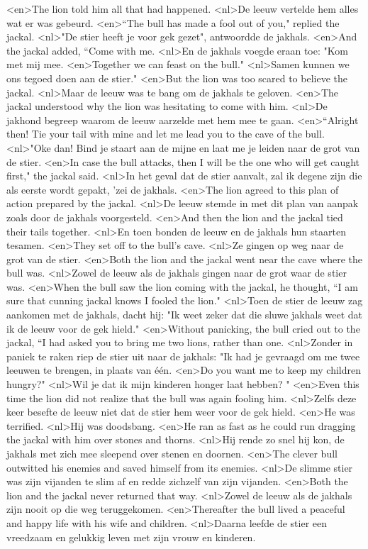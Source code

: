 <en>The lion told him all that had happened.
<nl>De leeuw vertelde hem alles wat er was gebeurd.
<en>“The bull has made a fool out of you," replied the jackal.
<nl>"De stier heeft je voor gek gezet", antwoordde de jakhals.
<en>And the jackal added, “Come with me.
<nl>En de jakhals voegde eraan toe: "Kom met mij mee.
<en>Together we can feast on the bull."
<nl>Samen kunnen we ons tegoed doen aan de stier."
<en>But the lion was too scared to believe the jackal.
<nl>Maar de leeuw was te bang om de jakhals te geloven.
<en>The jackal understood why the lion was hesitating to come with him.
<nl>De jakhond begreep waarom de leeuw aarzelde met hem mee te gaan.
<en>“Alright then! Tie your tail with mine and let me lead you to the cave of the bull.
<nl>"Oke dan! Bind je staart aan de mijne en laat me je leiden naar de grot van de stier.
<en>In case the bull attacks, then I will be the one who will get caught first," the jackal said.
<nl>In het geval dat de stier aanvalt, zal ik degene zijn die als eerste wordt gepakt, 'zei de jakhals.
<en>The lion agreed to this plan of action prepared by the jackal.
<nl>De leeuw stemde in met dit plan van aanpak zoals door de jakhals voorgesteld.
<en>And then the lion and the jackal tied their tails together.
<nl>En toen bonden de leeuw en de jakhals hun staarten tesamen.
<en>They set off to the bull’s cave.
<nl>Ze gingen op weg naar de grot van de stier.
<en>Both the lion and the jackal went near the cave where the bull was.
<nl>Zowel de leeuw als de jakhals gingen naar de grot waar de stier was.
<en>When the bull saw the lion coming with the jackal, he thought, “I am sure that cunning jackal knows I fooled the lion."
<nl>Toen de stier de leeuw zag aankomen met de jakhals, dacht hij: "Ik weet zeker dat die sluwe jakhals weet dat ik de leeuw voor de gek hield."
<en>Without panicking, the bull cried out to the jackal, “I had asked you to bring me two lions, rather than one.
<nl>Zonder in paniek te raken riep de stier uit naar de jakhals: "Ik had je gevraagd om me twee leeuwen te brengen, in plaats van één.
<en>Do you want me to keep my children hungry?"
<nl>Wil je dat ik mijn kinderen honger laat hebben? "
<en>Even this time the lion did not realize that the bull was again fooling him.
<nl>Zelfs deze keer besefte de leeuw niet dat de stier hem weer voor de gek hield.
<en>He was terrified.
<nl>Hij was doodsbang.
<en>He ran as fast as he could run dragging the jackal with him over stones and thorns.
<nl>Hij rende zo snel hij kon, de jakhals met zich mee sleepend over stenen en doornen.
<en>The clever bull outwitted his enemies and saved himself from its enemies.
<nl>De slimme stier was zijn vijanden te slim af en redde zichzelf van zijn vijanden.
<en>Both the lion and the jackal never returned that way.
<nl>Zowel de leeuw als de jakhals zijn nooit op die weg teruggekomen.
<en>Thereafter the bull lived a peaceful and happy life with his wife and children.
<nl>Daarna leefde de stier een vreedzaam en gelukkig leven met zijn vrouw en kinderen.
